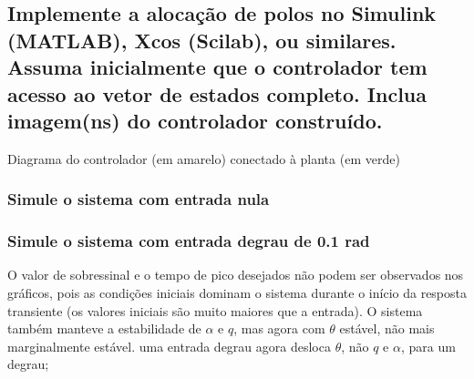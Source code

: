 \documentclass[13pt]{article}
\begin{document}
    \hypertarget{implemente-a-alocauxe7uxe3o-de-polos-no-simulink-matlab-xcos-scilab-ou-similares.-assuma-inicialmente-que-o-controlador-tem-acesso-ao-vetor-de-estados-completo.-inclua-imagemns-do-controlador-construuxeddo.}{%
\subsection{Implemente a alocação de polos no Simulink (MATLAB), Xcos
(Scilab), ou similares. Assuma inicialmente que o controlador tem acesso
ao vetor de estados completo. Inclua imagem(ns) do controlador
construído.}\label{implemente-a-alocauxe7uxe3o-de-polos-no-simulink-matlab-xcos-scilab-ou-similares.-assuma-inicialmente-que-o-controlador-tem-acesso-ao-vetor-de-estados-completo.-inclua-imagemns-do-controlador-construuxeddo.}}

    Diagrama do controlador (em amarelo) conectado à planta (em verde)

    \begin{figure}[H]
    \centering    
        
    \end{figure}

    \hypertarget{simule-o-sistema-com-entrada-nula}{%
\subsubsection{Simule o sistema com entrada
nula}\label{simule-o-sistema-com-entrada-nula}}

    \begin{figure}[H]
    \centering    
        
    \end{figure}

    \hypertarget{simule-o-sistema-com-entrada-degrau-de-0.1-rad}{%
\subsubsection{Simule o sistema com entrada degrau de 0.1
rad}\label{simule-o-sistema-com-entrada-degrau-de-0.1-rad}}

    \begin{figure}[H]
    \centering    
        
    \end{figure}

    O valor de sobressinal e o tempo de pico desejados não podem ser
observados nos gráficos, pois as condições iniciais dominam o sistema
durante o início da resposta transiente (os valores iniciais são muito
maiores que a entrada). O sistema também manteve a estabilidade de
\(\alpha\) e \(q\), mas agora com \(\theta\) estável, não mais
marginalmente estável. uma entrada degrau agora desloca \(\theta\), não
\(q\) e \(\alpha\), para um degrau;
\end{document}
